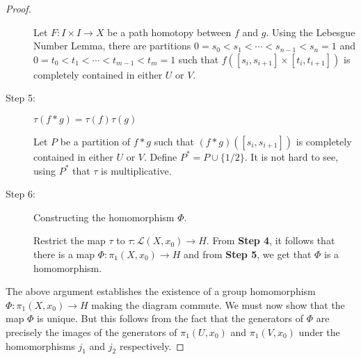 \begin{proof}
\begin{description}
Let $F: I\times I\to X$ be a path homotopy between $f$ and $g$. Using the Lebesgue Number Lemma, there are partitions $0 = s_0 < s_1 < \cdots < s_{n - 1} < s_n = 1$ and $0 = t_0 < t_1 < \cdots < t_{m - 1} < t_m = 1$ such that $f([s_i,s_{i + 1}]\times[t_i,t_{i + 1}])$ is completely contained in either $U$ or $V$.

\item[Step 5:] $\tau(f * g) = \tau(f)\tau(g)$

Let $P$ be a partition of $f * g$ such that $(f*g)([s_i,s_{i + 1}])$ is completely contained in either $U$ or $V$. Define $P^* = P\cup\{1/2\}$. It is not hard to see, using $P^*$ that $\tau$ is multiplicative.

\item[Step 6:] Constructing the homomorphism $\Phi$.

Restrict the map $\tau$ to $\tau:\mathscr L(X,x_0)\to H$. From \textbf{Step 4}, it follows that there is a map $\Phi:\pi_1(X,x_0)\to H$ and from \textbf{Step 5}, we get that $\Phi$ is a homomorphism.
\end{description}

The above argument establishes the existence of a group homomorphism $\Phi:\pi_1(X,x_0)\to H$ making the diagram commute. We must now show that the map $\Phi$ is unique. But this follows from the fact that the generators of $\Phi$ are precisely the images of the generators of $\pi_1(U,x_0)$ and $\pi_1(V,x_0)$ under the homomorphisms $j_1$ and $j_2$ respectively.
\end{proof}
